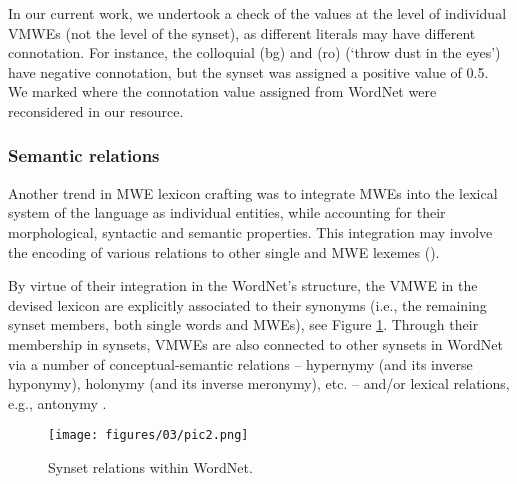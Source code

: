 \documentclass[output=paper,colorlinks,citecolor=brown]{langscibook}
\begin{document}
In our current work, we undertook a check of the values at the level of individual VMWEs (not the level of the synset), as different literals may have different connotation. For instance, the colloquial (bg)  and (ro)  (`throw dust in the eyes') have negative connotation, but the synset was assigned a positive value of 0.5. We marked where the connotation value assigned from WordNet were reconsidered in our resource. %

\subsubsection{Semantic relations}

Another trend in MWE lexicon crafting was to integrate MWEs into the lexical system of the language as individual entities, while accounting for their morphological, syntactic and semantic properties. This integration may involve the encoding of various relations to other single and MWE lexemes (). %

By virtue of their integration in the WordNet's structure, the VMWE in the devised lexicon are explicitly associated to their synonyms (i.e., the remaining synset members, both single words and MWEs), see Figure \ref{fig:synset-relations}. 
Through their membership in synsets, VMWEs are also connected to other synsets in WordNet via a number of conceptual-semantic relations -- hypernymy (and its inverse hyponymy), holonymy (and its inverse meronymy), etc. -- and/or lexical relations, e.g., antonymy \citep{miller,Fellbaum1998}. 


\begin{figure}
\texttt{[image: figures/03/pic2.png]}
\caption{Synset relations within WordNet.} \label{fig:synset-relations}
\end{figure}
\end{document}
